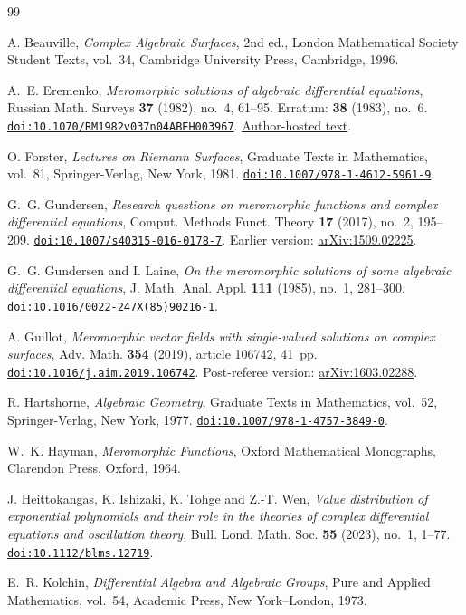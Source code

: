 \documentclass[11pt,reqno]{amsart}
\numberwithin{equation}{section}
\theoremstyle{definition}
\theoremstyle{remark}
\newcommand{\doi}[1]{\href{https://doi.org/#1}{\nolinkurl{doi:#1}}}
\begin{document}
\begin{thebibliography}{99}

A. Beauville,
\emph{Complex Algebraic Surfaces}, 2nd ed.,
London Mathematical Society Student Texts, vol.~34,
Cambridge University Press, Cambridge, 1996.

A.~E. Eremenko,
\emph{Meromorphic solutions of algebraic differential equations},
Russian Math. Surveys \textbf{37} (1982), no.~4, 61--95.
\newblock Erratum: \textbf{38} (1983), no.~6.
\doi{10.1070/RM1982v037n04ABEH003967}.
\href{https://www.math.purdue.edu/~eremenko/dvi/mer_ade.pdf}{Author-hosted text}.

O. Forster,
\emph{Lectures on Riemann Surfaces},
Graduate Texts in Mathematics, vol.~81,
Springer-Verlag, New York, 1981.
\doi{10.1007/978-1-4612-5961-9}.

G.~G. Gundersen,
\emph{Research questions on meromorphic functions and complex differential
equations},
Comput. Methods Funct. Theory \textbf{17} (2017), no.~2, 195--209.
\doi{10.1007/s40315-016-0178-7}.
Earlier version: \href{https://arxiv.org/abs/1509.02225}{arXiv:1509.02225}.

G.~G. Gundersen and I. Laine,
\emph{On the meromorphic solutions of some algebraic differential equations},
J. Math. Anal. Appl. \textbf{111} (1985), no.~1, 281--300.
\doi{10.1016/0022-247X(85)90216-1}.

A. Guillot,
\emph{Meromorphic vector fields with single-valued solutions on complex surfaces},
Adv. Math. \textbf{354} (2019), article 106742, 41~pp.
\doi{10.1016/j.aim.2019.106742}.
Post-referee version:
\href{https://arxiv.org/abs/1603.02288}{arXiv:1603.02288}.

R. Hartshorne,
\emph{Algebraic Geometry},
Graduate Texts in Mathematics, vol.~52, Springer-Verlag, New York, 1977.
\doi{10.1007/978-1-4757-3849-0}.

W.~K. Hayman,
\emph{Meromorphic Functions},
Oxford Mathematical Monographs, Clarendon Press, Oxford, 1964.

J. Heittokangas, K. Ishizaki, K. Tohge and Z.-T. Wen,
\emph{Value distribution of exponential polynomials and their role in the
theories of complex differential equations and oscillation theory},
Bull. Lond. Math. Soc. \textbf{55} (2023), no.~1, 1--77.
\doi{10.1112/blms.12719}.

E.~R. Kolchin,
\emph{Differential Algebra and Algebraic Groups},
Pure and Applied Mathematics, vol.~54, Academic Press,
New York--London, 1973.


\end{thebibliography}
\end{document}
